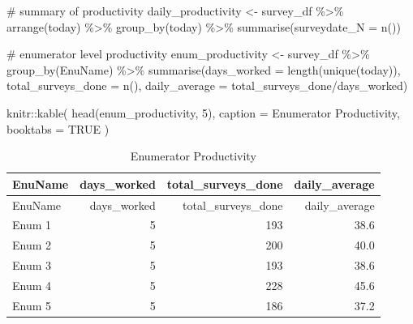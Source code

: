 \documentclass[
  letterpaper,
  DIV=11,
  numbers=noendperiod]{scrreprt}
\newenvironment{Shaded}{\begin{snugshade}}{\end{snugshade}}
\newcommand{\AttributeTok}[1]{\textcolor[rgb]{0.40,0.45,0.13}{#1}}
\newcommand{\CommentTok}[1]{\textcolor[rgb]{0.37,0.37,0.37}{#1}}
\newcommand{\ConstantTok}[1]{\textcolor[rgb]{0.56,0.35,0.01}{#1}}
\newcommand{\DecValTok}[1]{\textcolor[rgb]{0.68,0.00,0.00}{#1}}
\newcommand{\FunctionTok}[1]{\textcolor[rgb]{0.28,0.35,0.67}{#1}}
\newcommand{\NormalTok}[1]{\textcolor[rgb]{0.00,0.23,0.31}{#1}}
\newcommand{\OtherTok}[1]{\textcolor[rgb]{0.00,0.23,0.31}{#1}}
\newcommand{\SpecialCharTok}[1]{\textcolor[rgb]{0.37,0.37,0.37}{#1}}
\newcommand{\StringTok}[1]{\textcolor[rgb]{0.13,0.47,0.30}{#1}}
\begin{document}
\begin{Shaded}
\begin{Highlighting}[]
\CommentTok{\# summary of productivity}
\NormalTok{daily\_productivity }\OtherTok{\textless{}{-}}\NormalTok{ survey\_df }\SpecialCharTok{\%\textgreater{}\%} 
  \FunctionTok{arrange}\NormalTok{(today) }\SpecialCharTok{\%\textgreater{}\%} 
  \FunctionTok{group\_by}\NormalTok{(today) }\SpecialCharTok{\%\textgreater{}\%} 
  \FunctionTok{summarise}\NormalTok{(}\AttributeTok{surveydate\_N =} \FunctionTok{n}\NormalTok{())}

\CommentTok{\# enumerator level productivity}
\NormalTok{enum\_productivity }\OtherTok{\textless{}{-}}\NormalTok{ survey\_df }\SpecialCharTok{\%\textgreater{}\%} 
  \FunctionTok{group\_by}\NormalTok{(EnuName) }\SpecialCharTok{\%\textgreater{}\%} 
  \FunctionTok{summarise}\NormalTok{(}\AttributeTok{days\_worked =} \FunctionTok{length}\NormalTok{(}\FunctionTok{unique}\NormalTok{(today)), }\AttributeTok{total\_surveys\_done =} \FunctionTok{n}\NormalTok{(), }\AttributeTok{daily\_average =}\NormalTok{ total\_surveys\_done}\SpecialCharTok{/}\NormalTok{days\_worked)}
\end{Highlighting}
\end{Shaded}

\begin{Shaded}
\begin{Highlighting}[]
\NormalTok{knitr}\SpecialCharTok{::}\FunctionTok{kable}\NormalTok{(}
  \FunctionTok{head}\NormalTok{(enum\_productivity, }\DecValTok{5}\NormalTok{), }\AttributeTok{caption =} \StringTok{\textquotesingle{}Enumerator Productivity\textquotesingle{}}\NormalTok{,}
  \AttributeTok{booktabs =} \ConstantTok{TRUE}
\NormalTok{)}
\end{Highlighting}
\end{Shaded}

\begin{longtable}[]{@{}lrrr@{}}
\caption{Enumerator Productivity}\tabularnewline
\toprule\noalign{}
EnuName & days\_worked & total\_surveys\_done & daily\_average \\
\midrule\noalign{}
\endfirsthead
\toprule\noalign{}
EnuName & days\_worked & total\_surveys\_done & daily\_average \\
\midrule\noalign{}
\endhead
\bottomrule\noalign{}
\endlastfoot
Enum 1 & 5 & 193 & 38.6 \\
Enum 2 & 5 & 200 & 40.0 \\
Enum 3 & 5 & 193 & 38.6 \\
Enum 4 & 5 & 228 & 45.6 \\
Enum 5 & 5 & 186 & 37.2 \\
\end{longtable}
\end{document}

